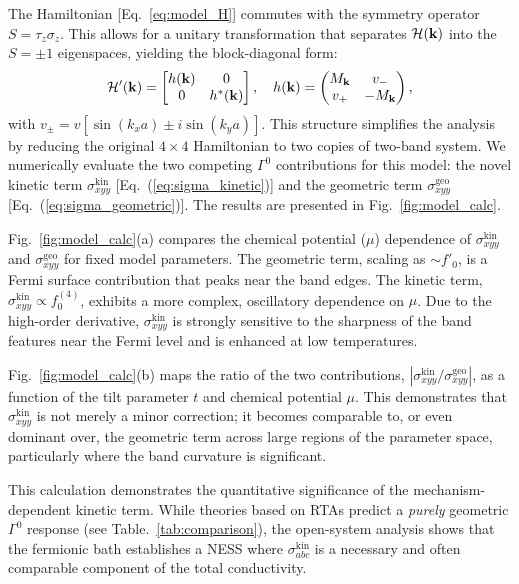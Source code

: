 \documentclass[twocolumn, prx, reprint, amsfonts, amsmath, amssymb, longbibliography, floatfix, aps]{revtex4-2}
\begin{document}
The Hamiltonian [Eq.~\eqref{eq:model_H}] commutes with the symmetry operator $S = \tau_z \sigma_z$. 
This allows for a unitary transformation that separates ${\cal H}({\bf k})$ into the $S = \pm 1$ eigenspaces, yielding the block-diagonal form:
\begin{align}
{\cal H}'({\bf k}) = \begin{bmatrix}
h({\bf k}) & 0 \\
0 & h^*({\bf k})
\end{bmatrix},
\quad
h({\bf k}) = \begin{pmatrix}
M_{{\bf k}} & v_- \\
v_+ & -M_{{\bf k}}
\end{pmatrix} ,
\end{align}
with $v_\pm = v [\sin(k_x a) \pm i  \sin(k_y a)]$.
This structure simplifies the analysis by reducing the original $4 \times 4$ Hamiltonian to two copies of two-band system. 
We numerically evaluate the two competing $\Gamma^0$ contributions for this model: the novel kinetic term $\sigma_{xyy}^{\text{kin}}$ [Eq.~(\ref{eq:sigma_kinetic})] and the geometric term $\sigma_{xyy}^{\text{geo}}$ [Eq.~(\ref{eq:sigma_geometric})].
The results are presented in Fig.~\ref{fig:model_calc}.

Fig.~\ref{fig:model_calc}(a) compares the chemical potential ($\mu$) dependence of $\sigma_{xyy}^{\text{kin}}$ and $\sigma_{xyy}^{\text{geo}}$ for fixed model parameters. 
The geometric term, scaling as $\sim f'_{0}$, is a Fermi surface contribution that peaks near the band edges. 
The kinetic term, $\sigma_{xyy}^{\text{kin}} \propto f^{(4)}_{0}$, exhibits a more complex, oscillatory dependence on $\mu$. 
Due to the high-order derivative, $\sigma_{xyy}^{\text{kin}}$ is strongly sensitive to the sharpness of the band features near the Fermi level and is enhanced at low temperatures.

Fig.~\ref{fig:model_calc}(b) maps the ratio of the two contributions, $|\sigma_{xyy}^{\text{kin}} / \sigma_{xyy}^{\text{geo}}|$, as a function of the tilt parameter $t$ and chemical potential $\mu$. This demonstrates that $\sigma_{xyy}^{\text{kin}}$ is not merely a minor correction; it becomes comparable to, or even dominant over, the geometric term across large regions of the parameter space, particularly where the band curvature is significant.

This calculation demonstrates the quantitative significance of the mechanism-dependent kinetic term. 
While theories based on RTAs predict a {\it purely} geometric $\Gamma^0$ response (see Table.~\ref{tab:comparison}), the open-system analysis shows that the fermionic bath establishes a NESS where $\sigma_{a b c}^{\text{kin}}$ is a necessary and often comparable component of the total conductivity.
\end{document}
